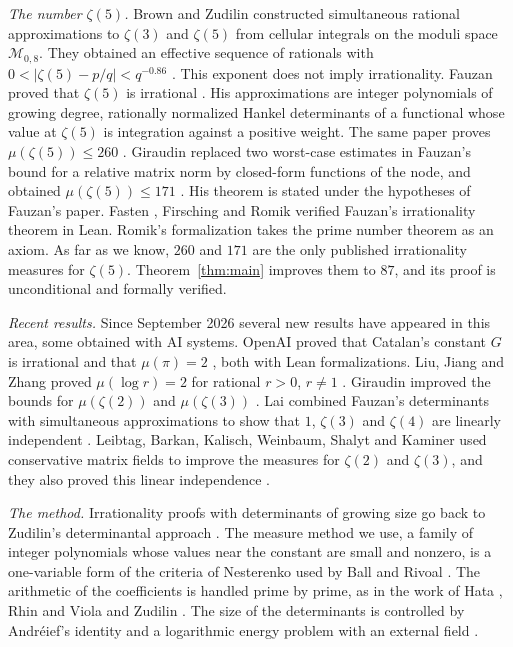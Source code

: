 \documentclass[11pt]{amsart}
\theoremstyle{definition}
\theoremstyle{remark}
\numberwithin{equation}{section}
\begin{document}
\emph{The number $\zeta(5)$.} Brown and Zudilin constructed simultaneous rational approximations to $\zeta(3)$ and
$\zeta(5)$ from cellular integrals on the moduli space $\mathcal M_{0,8}$. They obtained an effective sequence of
rationals with $0<|\zeta(5)-p/q|<q^{-0.86}$ \cite{BrownZudilin22}. This exponent does not imply irrationality. Fauzan
proved that $\zeta(5)$ is irrational \cite{Fauzan2026}. His approximations are integer polynomials of growing degree,
rationally normalized Hankel determinants of a functional whose value at $\zeta(5)$ is integration against a positive
weight. The same paper proves $\mu(\zeta(5))\le260$ \cite[Corollary~1.2]{Fauzan2026}. Giraudin replaced two
worst-case estimates in Fauzan's bound for a relative matrix norm by closed-form functions of the node, and obtained
$\mu(\zeta(5))\le171$ \cite{Giraudin26z5}. His theorem is stated under the hypotheses of Fauzan's paper. Fasten
\cite{Fasten26}, Firsching \cite{Firsching26} and Romik \cite{Romik26} verified Fauzan's irrationality theorem in Lean.
Romik's formalization takes the prime number theorem as an axiom. As far as we know, $260$ and $171$ are the only
published irrationality measures for $\zeta(5)$. Theorem~\ref{thm:main} improves them to $87$, and its proof is
unconditional and formally verified.

\emph{Recent results.} Since September 2026 several new results have appeared in this area, some obtained with AI
systems. OpenAI proved that Catalan's constant $G$ is irrational \cite{OpenAI2026} and that $\mu(\pi)=2$
\cite{OpenAIPi2026}, both with Lean formalizations. Liu, Jiang and Zhang proved $\mu(\log r)=2$ for rational $r>0$,
$r\ne1$ \cite{LiuJiangZhang26}. Giraudin improved the bounds for $\mu(\zeta(2))$ and $\mu(\zeta(3))$
\cite{Giraudin26,Giraudin26z3}. Lai combined Fauzan's determinants with simultaneous approximations to show that
$1$, $\zeta(3)$ and $\zeta(4)$ are linearly independent \cite{Lai2026}. Leibtag, Barkan, Kalisch, Weinbaum, Shalyt
and Kaminer used conservative matrix fields to improve the measures for $\zeta(2)$ and $\zeta(3)$, and they also
proved this linear independence \cite{LBKWSK26}.

\emph{The method.} Irrationality proofs with determinants of growing size go back to Zudilin's determinantal approach
\cite{Zudilin}. The measure method we use, a family of integer polynomials whose values near the constant are small
and nonzero, is a one-variable form of the criteria of Nesterenko \cite{Nesterenko85} used by Ball and Rivoal
\cite{BallRivoal01}. The arithmetic of the coefficients is handled prime by prime, as in the work of Hata
\cite{Hata93}, Rhin and Viola \cite{RhinViola96,RhinViola01} and Zudilin \cite{Zudilin04}. The size of the
determinants is controlled by Andr\'eief's identity \cite{Forrester2018Andreief} and a logarithmic energy problem with
an external field \cite{SaffTotik}.
\end{document}
